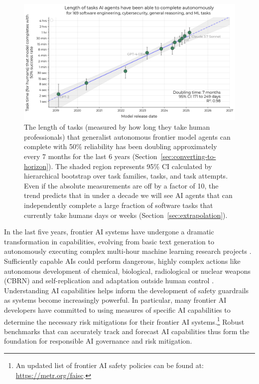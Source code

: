 \documentclass{article}
\begin{document}
\begin{figure}
    \centering
    \includegraphics[width=0.9\linewidth]{plots_non_github/headline-green.png}
    \caption{The length of tasks (measured by how long they take human professionals) that generalist autonomous frontier model agents can complete with 50\% reliability has been doubling approximately every 7 months for the last 6 years (Section~\ref{sec:converting-to-horizon}).
    The shaded region represents 95\% CI calculated by hierarchical bootstrap over task families, tasks, and task attempts.
    Even if the absolute measurements are off by a factor of 10, the trend predicts that in under a decade we will see AI agents that can independently complete a large fraction of software tasks that currently take humans days or weeks (Section~\ref{sec:extrapolation}). 
    }
    \label{fig:headline}
\end{figure}



\setcounter{footnote}{0} %
In the last five years, frontier AI systems have undergone a dramatic transformation in capabilities, evolving from basic text generation \citep{radford2019language} to autonomously executing complex multi-hour machine learning research projects \citep{wijk2024re}. 
Sufficiently capable AIs could perform dangerous, highly complex actions like autonomous development of chemical, biological, radiological or nuclear weapons (CBRN) and self-replication and adaptation outside human control \cite{phuong2024evaluating}.
Understanding AI capabilities helps inform the development of safety guardrails as systems become increasingly powerful. 
In particular, many frontier AI developers have committed to using measures of specific AI capabilities to determine the necessary risk mitigations for their frontier AI systems.\footnote{An updated list of frontier AI safety policies can be found at: \url{https://metr.org/faisc}.} 
Robust benchmarks that can accurately track and forecast AI capabilities thus form the foundation for responsible
AI governance and risk mitigation. 
\end{document}
